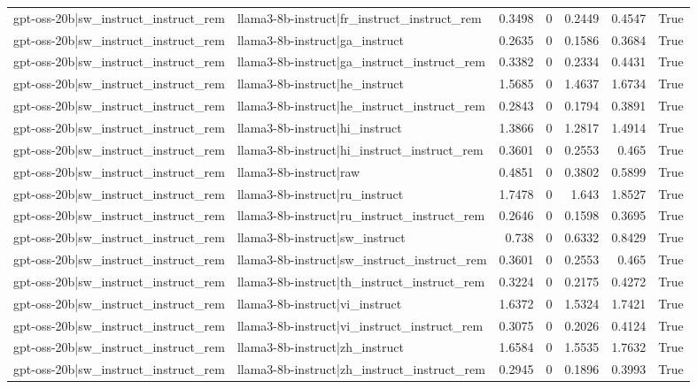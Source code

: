 \begin{table}
\begin{tabular}{l l r r r r l}
gpt-oss-20b|sw_instruct_instruct_rem & llama3-8b-instruct|fr_instruct_instruct_rem & 0.3498 & 0 & 0.2449 & 0.4547 & True \\
gpt-oss-20b|sw_instruct_instruct_rem & llama3-8b-instruct|ga_instruct & 0.2635 & 0 & 0.1586 & 0.3684 & True \\
gpt-oss-20b|sw_instruct_instruct_rem & llama3-8b-instruct|ga_instruct_instruct_rem & 0.3382 & 0 & 0.2334 & 0.4431 & True \\
gpt-oss-20b|sw_instruct_instruct_rem & llama3-8b-instruct|he_instruct & 1.5685 & 0 & 1.4637 & 1.6734 & True \\
gpt-oss-20b|sw_instruct_instruct_rem & llama3-8b-instruct|he_instruct_instruct_rem & 0.2843 & 0 & 0.1794 & 0.3891 & True \\
gpt-oss-20b|sw_instruct_instruct_rem & llama3-8b-instruct|hi_instruct & 1.3866 & 0 & 1.2817 & 1.4914 & True \\
gpt-oss-20b|sw_instruct_instruct_rem & llama3-8b-instruct|hi_instruct_instruct_rem & 0.3601 & 0 & 0.2553 & 0.465 & True \\
gpt-oss-20b|sw_instruct_instruct_rem & llama3-8b-instruct|raw & 0.4851 & 0 & 0.3802 & 0.5899 & True \\
gpt-oss-20b|sw_instruct_instruct_rem & llama3-8b-instruct|ru_instruct & 1.7478 & 0 & 1.643 & 1.8527 & True \\
gpt-oss-20b|sw_instruct_instruct_rem & llama3-8b-instruct|ru_instruct_instruct_rem & 0.2646 & 0 & 0.1598 & 0.3695 & True \\
gpt-oss-20b|sw_instruct_instruct_rem & llama3-8b-instruct|sw_instruct & 0.738 & 0 & 0.6332 & 0.8429 & True \\
gpt-oss-20b|sw_instruct_instruct_rem & llama3-8b-instruct|sw_instruct_instruct_rem & 0.3601 & 0 & 0.2553 & 0.465 & True \\
gpt-oss-20b|sw_instruct_instruct_rem & llama3-8b-instruct|th_instruct_instruct_rem & 0.3224 & 0 & 0.2175 & 0.4272 & True \\
gpt-oss-20b|sw_instruct_instruct_rem & llama3-8b-instruct|vi_instruct & 1.6372 & 0 & 1.5324 & 1.7421 & True \\
gpt-oss-20b|sw_instruct_instruct_rem & llama3-8b-instruct|vi_instruct_instruct_rem & 0.3075 & 0 & 0.2026 & 0.4124 & True \\
gpt-oss-20b|sw_instruct_instruct_rem & llama3-8b-instruct|zh_instruct & 1.6584 & 0 & 1.5535 & 1.7632 & True \\
gpt-oss-20b|sw_instruct_instruct_rem & llama3-8b-instruct|zh_instruct_instruct_rem & 0.2945 & 0 & 0.1896 & 0.3993 & True \\

\end{tabular}
\end{table}
